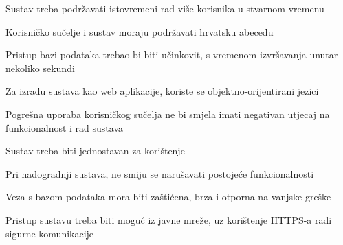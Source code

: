 		\begin{packed_item}
			\item Sustav treba podržavati istovremeni rad više korisnika u stvarnom vremenu
			\item Korisničko sučelje i sustav moraju podržavati hrvatsku abecedu 
			\item Pristup bazi podataka trebao bi biti učinkovit, s vremenom izvršavanja unutar nekoliko sekundi
			\item Za izradu sustava kao web aplikacije, koriste se objektno-orijentirani jezici
			\item Pogrešna uporaba korisničkog sučelja ne bi smjela imati negativan utjecaj na funkcionalnost i rad sustava
			\item Sustav treba biti jednostavan za korištenje
			\item Pri nadogradnji sustava, ne smiju se narušavati postojeće funkcionalnosti
			\item Veza s bazom podataka mora biti zaštićena, brza i otporna na vanjske greške
			\item Pristup sustavu treba biti moguć iz javne mreže, uz korištenje HTTPS-a radi sigurne komunikacije
		\end{packed_item}
	